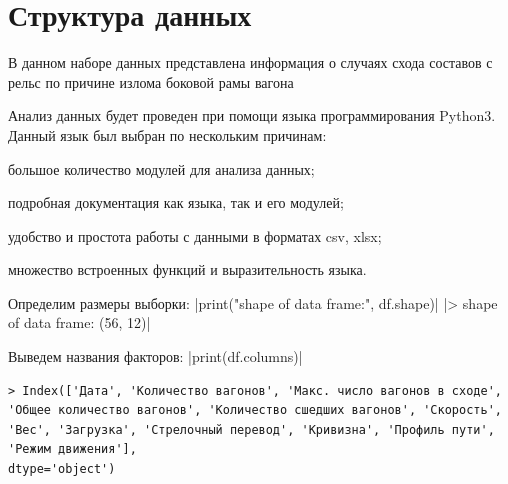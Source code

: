 \section{Структура данных}

В данном наборе данных представлена информация о случаях схода составов с рельс по причине излома боковой рамы вагона

Анализ данных будет проведен при помощи языка программирования Python3. Данный язык был выбран по нескольким причинам:
\begin{description}[font=$\bullet$]
\item большое количество модулей для анализа данных;
\item подробная документация как языка, так и его модулей;
\item удобство и простота работы с данными в форматах csv, xlsx;
\item множество встроенных функций и выразительность языка.
\end{description}

Определим размеры выборки:
|print("shape of data frame:", df.shape)|
|> shape of data frame: (56, 12)|

Выведем названия факторов:
|print(df.columns)|
\begin{verbatim}
> Index(['Дата', 'Количество вагонов', 'Макс. число вагонов в сходе',
'Общее количество вагонов', 'Количество сшедших вагонов', 'Скорость',
'Вес', 'Загрузка', 'Стрелочный перевод', 'Кривизна', 'Профиль пути',
'Режим движения'],
dtype='object')
\end{verbatim}

